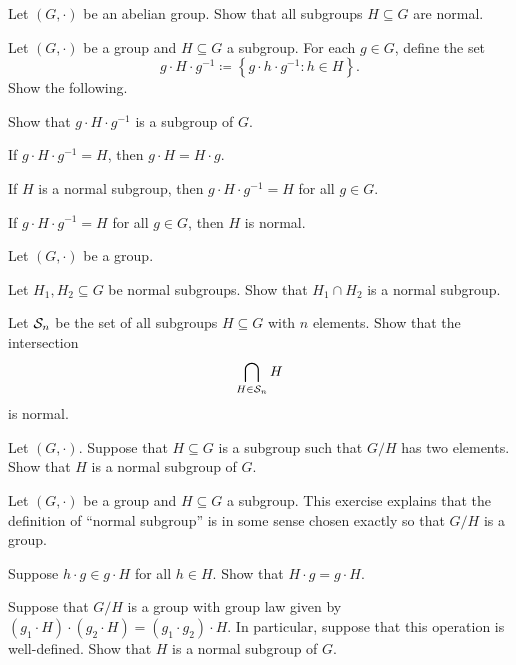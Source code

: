 \documentclass[../main.tex]{subfiles}
\begin{document}
\begin{homework}
    Let $(G,\cdot)$ be an abelian group. Show that all subgroups $H\subseteq G$ are normal.
\end{homework}

\begin{homework}
    Let $(G,\cdot)$ be a group and $H\subseteq G$ a subgroup. For each $g\in G$, define the set
    \[g\cdot H\cdot g^{-1}\coloneqq\left\{g\cdot h\cdot g^{-1}:h\in H\right\}.\]
    Show the following.
    \begin{listalph}
        \item Show that $g\cdot H\cdot g^{-1}$ is a subgroup of $G$.
        \item If $g\cdot H\cdot g^{-1}=H$, then $g\cdot H=H\cdot g$.
        \item If $H$ is a normal subgroup, then $g\cdot H\cdot g^{-1}=H$ for all $g\in G$.
        \item If $g\cdot H\cdot g^{-1}=H$ for all $g\in G$, then $H$ is normal.
    \end{listalph}
\end{homework}

\begin{homework}
    Let $(G,\cdot)$ be a group.
    \begin{listalph}
        \item Let $H_1,H_2\subseteq G$ be normal subgroups. Show that $H_1\cap H_2$ is a normal subgroup.
        \item Let $\mathcal{S}_n$ be the set of all subgroups $H\subseteq G$ with $n$ elements. Show that the intersection
        \[\bigcap_{H\in\mathcal{S}_n}H\]
        is normal.
    \end{listalph}
\end{homework}

\begin{homework}
    Let $(G,\cdot)$. Suppose that $H\subseteq G$ is a subgroup such that $G/H$ has two elements. Show that $H$ is a normal subgroup of $G$.
\end{homework}

\begin{homework}
    Let $(G,\cdot)$ be a group and $H\subseteq G$ a subgroup. This exercise explains that the definition of ``normal subgroup'' is in some sense chosen exactly so that $G/H$ is a group.
    \begin{listalph}
        \item Suppose $h\cdot g\in g\cdot H$ for all $h\in H$. Show that $H\cdot g=g\cdot H$.
        \item Suppose that $G/H$ is a group with group law given by $(g_1\cdot H)\cdot(g_2\cdot H)=(g_1\cdot g_2)\cdot H$. In particular, suppose that this operation is well-defined. Show that $H$ is a normal subgroup of $G$.
    \end{listalph}
\end{homework}
\end{document}
